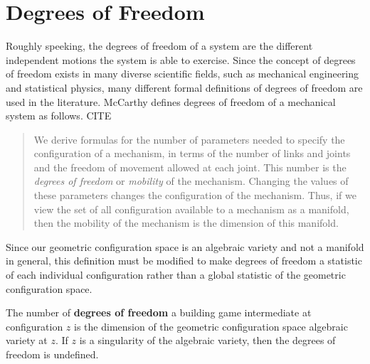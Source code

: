 \section{Degrees of Freedom}
Roughly speeking, the degrees of freedom of a system are the different independent motions the system is able to exercise. Since the concept of degrees of freedom exists in many diverse scientific fields, such as mechanical engineering and statistical physics, many different formal definitions of degrees of freedom are used in the literature. McCarthy defines degrees of freedom of a mechanical system as follows. CITE 
\begin{quote}
We derive formulas for the number of parameters needed to specify the configuration of a mechanism, in terms of the number of links and joints and the freedom of movement allowed at each joint. This number is the \textit{degrees of freedom} or \textit{mobility} of the mechanism. Changing the values of these parameters changes the configuration of the mechanism. Thus, if we view the set of all configuration available to a mechanism as a manifold, then the mobility of the mechanism is the dimension of this manifold. 
\end{quote}

Since our geometric configuration space is an algebraic variety and not a manifold in general, this definition must be modified to make degrees of freedom a statistic of each individual configuration rather than a global statistic of the geometric configuration space. 

\begin{mydef}
The number of \textbf{degrees of freedom} a building game intermediate at configuration $z$ is the dimension of the geometric configuration space algebraic variety at $z$. If $z$ is a singularity of the algebraic variety, then the degrees of freedom is undefined.
\end{mydef}

